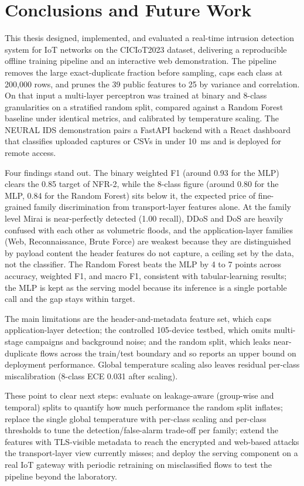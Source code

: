 \chapter{Conclusions and Future Work}
\label{chap:conclusions}

\par This thesis designed, implemented, and evaluated a real-time intrusion detection system for IoT networks on the CICIoT2023 dataset, delivering a reproducible offline training pipeline and an interactive web demonstration. The pipeline removes the large exact-duplicate fraction before sampling, caps each class at 200{,}000 rows, and prunes the 39 public features to 25 by variance and correlation. On that input a multi-layer perceptron was trained at binary and 8-class granularities on a stratified random split, compared against a Random Forest baseline under identical metrics, and calibrated by temperature scaling. The NEURAL IDS demonstration pairs a FastAPI backend with a React dashboard that classifies uploaded captures or CSVs in under 10~ms and is deployed for remote access.

\par Four findings stand out. The binary weighted F1 (around 0.93 for the MLP) clears the 0.85 target of NFR-2, while the 8-class figure (around 0.80 for the MLP, 0.84 for the Random Forest) sits below it, the expected price of fine-grained family discrimination from transport-layer features alone. At the family level Mirai is near-perfectly detected (1.00 recall), DDoS and DoS are heavily confused with each other as volumetric floods, and the application-layer families (Web, Reconnaissance, Brute Force) are weakest because they are distinguished by payload content the header features do not capture, a ceiling set by the data, not the classifier. The Random Forest beats the MLP by 4 to 7 points across accuracy, weighted F1, and macro F1, consistent with tabular-learning results; the MLP is kept as the serving model because its inference is a single portable call and the gap stays within target.

\par The main limitations are the header-and-metadata feature set, which caps application-layer detection; the controlled 105-device testbed, which omits multi-stage campaigns and background noise; and the random split, which leaks near-duplicate flows across the train/test boundary and so reports an upper bound on deployment performance. Global temperature scaling also leaves residual per-class miscalibration (8-class ECE 0.031 after scaling).

\par These point to clear next steps: evaluate on leakage-aware (group-wise and temporal) splits to quantify how much performance the random split inflates; replace the single global temperature with per-class scaling and per-class thresholds to tune the detection/false-alarm trade-off per family; extend the features with TLS-visible metadata to reach the encrypted and web-based attacks the transport-layer view currently misses; and deploy the serving component on a real IoT gateway with periodic retraining on misclassified flows to test the pipeline beyond the laboratory.
